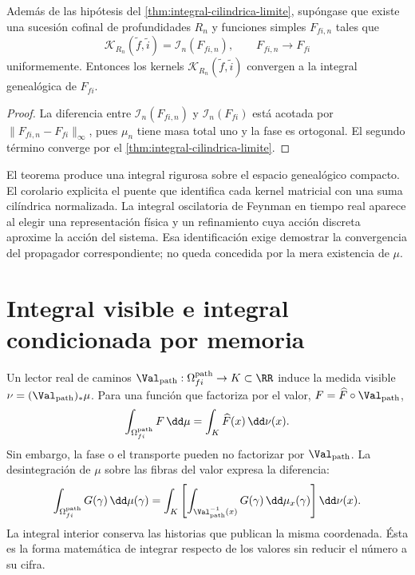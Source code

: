 \begin{corollary}
\label{cor:convergencia-kernels-discretos}
Además de las hipótesis del
\cref{thm:integral-cilindrica-limite}, supóngase que existe una sucesión
cofinal de profundidades \(R_n\) y funciones simples \(F_{fi,n}\) tales que
\[
 \mathcal K_{R_n}(\widetilde f,\widetilde i)
 =\mathcal I_n(F_{fi,n}),
 \qquad
 F_{fi,n}\longrightarrow F_{fi}
\]
uniformemente. Entonces los kernels
\(\mathcal K_{R_n}(\widetilde f,\widetilde i)\) convergen a la integral
genealógica de \(F_{fi}\).
\end{corollary}

\begin{proof}
La diferencia entre \(\mathcal I_n(F_{fi,n})\) y
\(\mathcal I_n(F_{fi})\) está acotada por
\(\|F_{fi,n}-F_{fi}\|_\infty\), pues \(\mu_n\) tiene masa total uno y la
fase es ortogonal. El segundo término converge por el
\cref{thm:integral-cilindrica-limite}.
\end{proof}

El teorema produce una integral rigurosa sobre el espacio genealógico
compacto. El corolario explicita el puente que identifica cada kernel
matricial con una suma cilíndrica normalizada. La integral oscilatoria de
Feynman en tiempo real aparece al elegir
una representación física y un refinamiento cuya acción discreta aproxime la
acción del sistema. Esa identificación exige demostrar la convergencia del
propagador correspondiente; no queda concedida por la mera existencia de
\(\mu\).

\section{Integral visible e integral condicionada por memoria}

Un lector real de caminos
\(\Val_{\rm path}:\Omega_{fi}^{\rm path}\to K\subset\RR\) induce la medida
visible \(\nu=(\Val_{\rm path})_*\mu\). Para una función que factoriza por el
valor, \(F=\widehat F\circ\Val_{\rm path}\),
\[
 \int_{\Omega_{fi}^{\rm path}}F\,\dd\mu
 =\int_K\widehat F(x)\,\dd\nu(x).
\]
Sin embargo, la fase o el transporte pueden no factorizar por
\(\Val_{\rm path}\). La
desintegración de \(\mu\) sobre las fibras del valor expresa la diferencia:
\begin{equation}
 \int_{\Omega_{fi}^{\rm path}}G(\gamma)\,\dd\mu(\gamma)
 =\int_K
   \left[
    \int_{\Val_{\rm path}^{-1}(x)}G(\gamma)\,\dd\mu_x(\gamma)
   \right]\dd\nu(x).
 \label{eq:desintegracion-caminos}
\end{equation}
La integral interior conserva las historias que publican la misma coordenada.
Ésta es la forma matemática de integrar respecto de los valores sin reducir el
número a su cifra.

